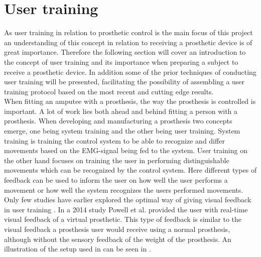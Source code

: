 
\section{User training} \label{sec:BG:userTraining}

As user training in relation to prosthetic control is the main focus of this project an understanding of this concept in relation to receiving a prosthetic device is of great importance. Therefore the following section will cover an introduction to the concept of user training and its importance when preparing a subject to receive a prosthetic device. In addition some of the prior techniques of conducting user training will be presented, facilitating the possibility of assembling a user training protocol based on the most recent and cutting edge results. \\
When fitting an amputee with a prosthesis, the way the prosthesis is controlled is important. A lot of work lies both ahead and behind fitting a person with a prosthesis. When developing and manufacturing a prosthesis two concepts emerge, one being system training and the other being user training. System training is training the control system to be able to recognize and differ movements based on the EMG-signal being fed to the system. \cite{Fougner2012} User training on the other hand focuses on training the user in performing distinguishable movements which can be recognized by the control system. Here different types of feedback can be used to inform the user on how well the user performs a movement or how well the system recognizes the users performed movements. \cite{Powell2014,Simon2013} \\
Only few studies have earlier explored the optimal way of giving visual feedback in user training \cite{Jiang2012}. In a 2014 study Powell et al. \cite{Powell2014} provided the user with real-time visual feedback of a virtual prosthetic. This type of feedback is similar to the visual feedback a prosthesis user would receive using a normal prosthesis, although without the sensory feedback of the weight of the prosthesis. An illustration of the setup used in \cite{Powell2014} can be seen in .

